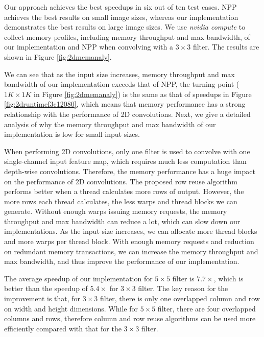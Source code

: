 Our approach achieves the best speedups in six out of ten test cases. NPP achieves the best results on small image sizes, whereas our
implementation demonstrates the best results on large image sizes. We use \emph{nvidia compute} to collect memory profiles, including
memory throughput and max bandwidth, of our implementation and NPP when convolving with a $3 \times 3$ filter. The results are shown in
Figure \ref{fig:2dmemanaly}.

We can see that as the input size increases, memory throughput and max bandwidth of our implementation exceeds that of NPP, the turning point ($1K \times 1K$ in Figure \ref{fig:2dmemanaly}) is the same as that of speedups in Figure \ref{fig:2druntimef3c12080}, which means that memory performance has a strong relationship with the performance of 2D convolutions. Next, we give a detailed analysis of why the memory throughput and max bandwidth of our implementation is low for small input sizes.

When performing 2D convolutions, only one filter is used to convolve with one single-channel input feature map, which requires much less computation than depth-wise convolutions. Therefore, the memory performance has a huge impact on the performance of 2D convolutions. The proposed row reuse algorithm performs better when a thread calculates more rows of output. However, the more rows each thread calculates, the less warps and thread blocks we can generate. Without enough warps issuing memory requests, the memory throughput and max bandwidth can reduce a lot, which can slow down our implementations. As the input size increases, we can allocate more thread blocks and more warps per thread block. With enough memory requests and reduction on redundant memory transactions, we can increase the memory throughput and max bandwidth, and thus improve the performance of our implementation.

The average speedup of our implementation for $5 \times 5$ filter is $7.7\times$, which is better than the speedup of $5.4\times$ for $3 \times 3$ filter. The key reason for the improvement is that, for $3 \times 3$ filter, there is only one overlapped column and row on width and height dimensions. While for $5 \times 5$ filter, there are four overlapped columns and rows, therefore column and row reuse algorithms can be used more efficiently compared with  that for the $3 \times 3$ filter.



